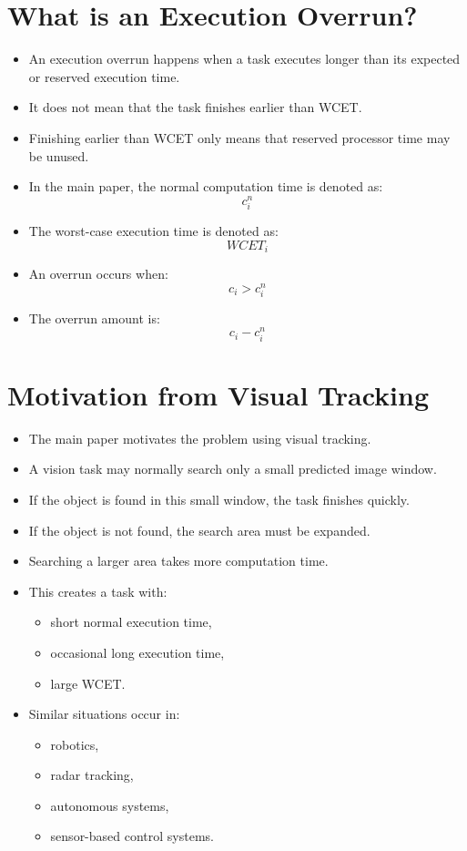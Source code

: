 \documentclass[a4paper,11pt]{article}
\begin{document}
\section*{What is an Execution Overrun?}

\begin{itemize}
    \item An execution overrun happens when a task executes longer than its expected or reserved execution time.
    \item It does not mean that the task finishes earlier than WCET.
    \item Finishing earlier than WCET only means that reserved processor time may be unused.
    \item In the main paper, the normal computation time is denoted as:
    \[
        c_i^n
    \]
    \item The worst-case execution time is denoted as:
    \[
        WCET_i
    \]
    \item An overrun occurs when:
    \[
        c_i > c_i^n
    \]
    \item The overrun amount is:
    \[
        c_i - c_i^n
    \]
\end{itemize}

\section*{Motivation from Visual Tracking}

\begin{itemize}
    \item The main paper motivates the problem using visual tracking.
    \item A vision task may normally search only a small predicted image window.
    \item If the object is found in this small window, the task finishes quickly.
    \item If the object is not found, the search area must be expanded.
    \item Searching a larger area takes more computation time.
    \item This creates a task with:
    \begin{itemize}
        \item short normal execution time,
        \item occasional long execution time,
        \item large WCET.
    \end{itemize}
    \item Similar situations occur in:
    \begin{itemize}
        \item robotics,
        \item radar tracking,
        \item autonomous systems,
        \item sensor-based control systems.
    \end{itemize}
\end{itemize}
\end{document}
